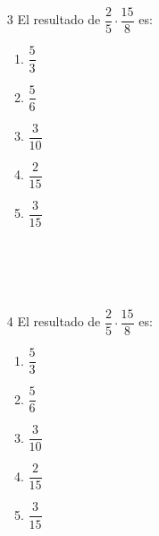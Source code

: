 \documentclass[12pt]{article}
\begin{document}
\begin{multicols}{2}
\ \\ \ \\ \ \\ \ \\
		\begin{enumerate}
		\item [3]El resultado de $\dfrac{2}{5} \cdot \dfrac{15}{8}$	es:
	
		\begin{enumerate}
			\item $\dfrac{5}{3}$\\
			\item $\dfrac{5}{6}$\\
			\item $\dfrac{3}{10}$\\
			\item $\dfrac{2}{15}$\\
			\item $\dfrac{3}{15}$\\
		\\ \ \\ \ \\ \ \\
	\end{enumerate}
	\end{enumerate}
\begin{enumerate}
	\item [4]El resultado de $\dfrac{2}{5} \cdot \dfrac{15}{8}$	es:
	\begin{enumerate}
		\item $\dfrac{5}{3}$\\
		\item $\dfrac{5}{6}$\\
		\item $\dfrac{3}{10}$\\
		\item $\dfrac{2}{15}$\\
		\item $\dfrac{3}{15}$\\
	
	\end{enumerate}
\end{enumerate}
\end{multicols}	
\end{document}

